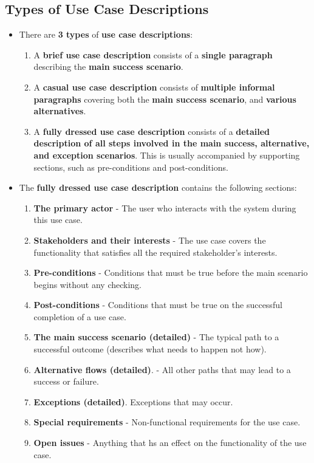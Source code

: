\documentclass[16pt]{article}
\begin{document}
    \subsection*{Types of Use Case Descriptions}
    \begin{itemize}
        \item There are \textbf{3 types} of \textbf{use case descriptions}:
        \begin{enumerate}
            \item A \textbf{brief use case description} consists of a \textbf{single paragraph} describing the \textbf{main success scenario}.
            \item A \textbf{casual use case description} consists of \textbf{multiple informal paragraphs} covering both the \textbf{main success scenario}, and \textbf{various alternatives}.
            \item A \textbf{fully dressed use case description} consists of a \textbf{detailed description of all steps involved in the main success, alternative, and exception scenarios}. This is usually accompanied by supporting sections, such as pre-conditions and post-conditions.
        \end{enumerate}
        \item The \textbf{fully dressed use case description} contains the following sections:
        \begin{enumerate}
            \item \textbf{The primary actor} - The user who interacts with the system during this use case.
            \item \textbf{Stakeholders and their interests} - The use case covers the functionality that satisfies all the required stakeholder's interests.
            \item \textbf{Pre-conditions} - Conditions that must be true before the main scenario begins without any checking.
            \item \textbf{Post-conditions} - Conditions that must be true on the successful completion of a use case.
            \item \textbf{The main success scenario (detailed)} - The typical path to a successful outcome (describes what needs to happen not how).
            \item \textbf{Alternative flows (detailed)}. - All other paths that may lead to a success or failure.
            \item \textbf{Exceptions (detailed)}. Exceptions that may occur.
            \item \textbf{Special requirements} - Non-functional requirements for the use case.
            \item \textbf{Open issues} - Anything that hs an effect on the functionality of the use case.
        \end{enumerate}
    \end{itemize}
\end{document}
